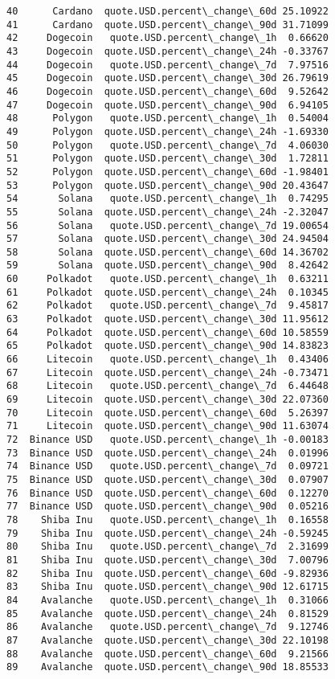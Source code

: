\documentclass[11pt]{article}
\begin{document}
\begin{tcolorbox}[breakable, size=fbox, boxrule=.5pt, pad at break*=1mm, opacityfill=0]
\begin{Verbatim}[commandchars=\\\{\}]
40      Cardano  quote.USD.percent\_change\_60d 25.10922
41      Cardano  quote.USD.percent\_change\_90d 31.71099
42     Dogecoin   quote.USD.percent\_change\_1h  0.66620
43     Dogecoin  quote.USD.percent\_change\_24h -0.33767
44     Dogecoin   quote.USD.percent\_change\_7d  7.97516
45     Dogecoin  quote.USD.percent\_change\_30d 26.79619
46     Dogecoin  quote.USD.percent\_change\_60d  9.52642
47     Dogecoin  quote.USD.percent\_change\_90d  6.94105
48      Polygon   quote.USD.percent\_change\_1h  0.54004
49      Polygon  quote.USD.percent\_change\_24h -1.69330
50      Polygon   quote.USD.percent\_change\_7d  4.06030
51      Polygon  quote.USD.percent\_change\_30d  1.72811
52      Polygon  quote.USD.percent\_change\_60d -1.98401
53      Polygon  quote.USD.percent\_change\_90d 20.43647
54       Solana   quote.USD.percent\_change\_1h  0.74295
55       Solana  quote.USD.percent\_change\_24h -2.32047
56       Solana   quote.USD.percent\_change\_7d 19.00654
57       Solana  quote.USD.percent\_change\_30d 24.94504
58       Solana  quote.USD.percent\_change\_60d 14.36702
59       Solana  quote.USD.percent\_change\_90d  8.42642
60     Polkadot   quote.USD.percent\_change\_1h  0.63211
61     Polkadot  quote.USD.percent\_change\_24h  0.10345
62     Polkadot   quote.USD.percent\_change\_7d  9.45817
63     Polkadot  quote.USD.percent\_change\_30d 11.95612
64     Polkadot  quote.USD.percent\_change\_60d 10.58559
65     Polkadot  quote.USD.percent\_change\_90d 14.83823
66     Litecoin   quote.USD.percent\_change\_1h  0.43406
67     Litecoin  quote.USD.percent\_change\_24h -0.73471
68     Litecoin   quote.USD.percent\_change\_7d  6.44648
69     Litecoin  quote.USD.percent\_change\_30d 22.07360
70     Litecoin  quote.USD.percent\_change\_60d  5.26397
71     Litecoin  quote.USD.percent\_change\_90d 11.63074
72  Binance USD   quote.USD.percent\_change\_1h -0.00183
73  Binance USD  quote.USD.percent\_change\_24h  0.01996
74  Binance USD   quote.USD.percent\_change\_7d  0.09721
75  Binance USD  quote.USD.percent\_change\_30d  0.07907
76  Binance USD  quote.USD.percent\_change\_60d  0.12270
77  Binance USD  quote.USD.percent\_change\_90d  0.05216
78    Shiba Inu   quote.USD.percent\_change\_1h  0.16558
79    Shiba Inu  quote.USD.percent\_change\_24h -0.59245
80    Shiba Inu   quote.USD.percent\_change\_7d  2.31699
81    Shiba Inu  quote.USD.percent\_change\_30d  7.00796
82    Shiba Inu  quote.USD.percent\_change\_60d -9.82936
83    Shiba Inu  quote.USD.percent\_change\_90d 12.61715
84    Avalanche   quote.USD.percent\_change\_1h  0.31066
85    Avalanche  quote.USD.percent\_change\_24h  0.81529
86    Avalanche   quote.USD.percent\_change\_7d  9.12746
87    Avalanche  quote.USD.percent\_change\_30d 22.10198
88    Avalanche  quote.USD.percent\_change\_60d  9.21566
89    Avalanche  quote.USD.percent\_change\_90d 18.85533
\end{Verbatim}
\end{tcolorbox}
        
\end{document}
